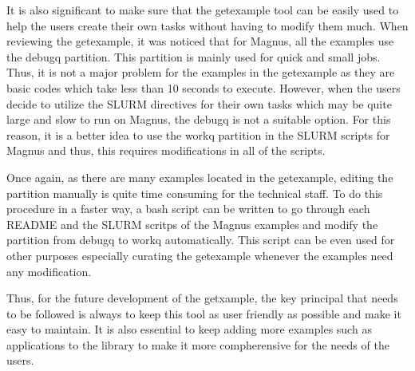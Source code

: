It is also significant to make sure that the getexample tool can be easily used to help the users create their own tasks without having to modify them
much. When reviewing the getexample, it was noticed that for Magnus, all the examples use the debugq partition. This partition is mainly used
for quick and small jobs. Thus, it is not a major problem for the examples in the getexample as they are basic codes which take less than 10 seconds 
to execute. However, when the users decide to utilize the SLURM directives for their own tasks which may be quite large and slow to run on Magnus, the 
debugq is not a suitable option. For this reason, it is a better idea to use the workq partition in the SLURM scripts for Magnus and thus, this requires 
modifications in all of the scripts.

Once again, as there are many examples located in the getexample, editing the partition manually is quite time consuming for the technical staff. To do 
this procedure in a faster way, a bash script can be written to go through each README and the SLURM scritps of the Magnus examples and modify the 
partition from debugq to workq automatically. This script can be even used for other purposes especially curating the getexample whenever the examples 
need any modification.   

Thus, for the future development of the getxample, the key principal that needs to be followed is always to keep this tool as user friendly as possible 
and make it easy to maintain. It is also essential to keep adding more examples such as applications to the library to make it more compherensive for 
the needs of the users.  
